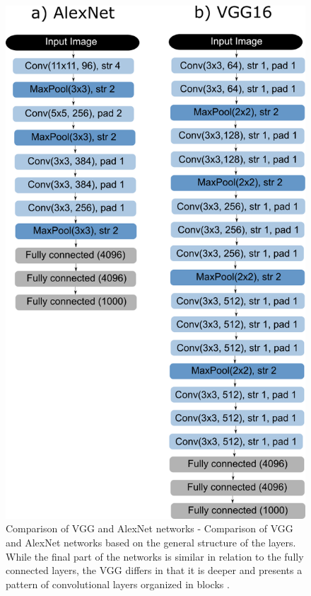 \begin{figure}
    \centering
    \includegraphics[scale=0.4]{images/figure130.png}
    \caption{ Comparison of VGG and AlexNet networks - Comparison of VGG and AlexNet networks based on the general structure of the layers. While the final part of the networks is similar in relation to the fully connected layers, the VGG differs in that it is deeper and presents a pattern of convolutional layers organized in blocks  \cite{johnson2019}.}
    \label{fig:alexnetvgg}
\end{figure}

